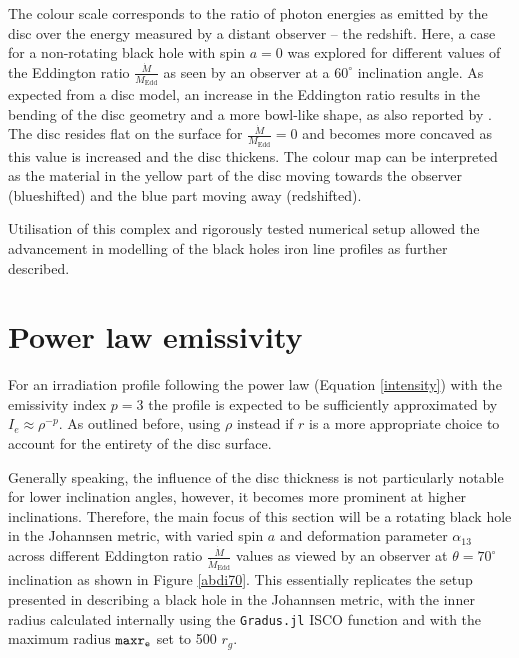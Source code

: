 \documentclass[fleqn,usenatbib,useAMS]{mnras}
\begin{document}
The colour scale corresponds to the ratio of photon energies as emitted by the disc over the energy measured by a distant observer -- the redshift. Here, a case for a non-rotating black hole with spin $a = 0$ was explored for different values of the Eddington ratio $\frac{\dot M}{M_{\text{Edd}}}$ as seen by an observer at a $60^{\circ}$ inclination angle. As expected from a \cite{shakura1973black} disc model, an increase in the Eddington ratio results in the bending of the disc geometry and a more bowl-like shape, as also reported by \cite{taylor2018exploring}. The disc resides flat on the surface for $\frac{\dot M}{M_{\text{Edd}}} = 0$ and becomes more concaved as this value is increased and the disc thickens. The colour map can be interpreted as the material in the yellow part of the disc moving towards the observer (blueshifted) and the blue part moving away (redshifted).

Utilisation of this complex and rigorously tested numerical setup allowed the advancement in  modelling of the black holes iron line profiles as further described.

\section{Power law emissivity}
For an irradiation profile following the power law (Equation \ref{intensity}) with the emissivity index $p = 3$ the profile is expected to be sufficiently approximated by $I_{e} \approx \rho^{-p}$. As outlined before, using $\rho$ instead if $r$ is a more appropriate choice to account for the entirety of the disc surface. 

Generally speaking, the influence of the disc thickness is not particularly notable for lower inclination angles, however, it becomes more prominent at higher inclinations. Therefore, the main focus of this section will be a rotating black hole in the Johannsen metric, with varied spin $a$ and deformation parameter $\alpha_{13}$ across different Eddington ratio $\frac{\dot{M}}{\dot{M}_\text{Edd}}$ values as viewed by an observer at $\theta = 70^{\circ}$ inclination as shown in Figure \ref{abdi70}. This essentially replicates the setup presented in \cite{abdikamalov2020testing} describing a black hole in the Johannsen metric, with the inner radius calculated internally using the {\tt Gradus.jl} ISCO function and with the maximum radius ${\tt maxr_{e}}$ set to 500 $r_{g}$.
\end{document}
